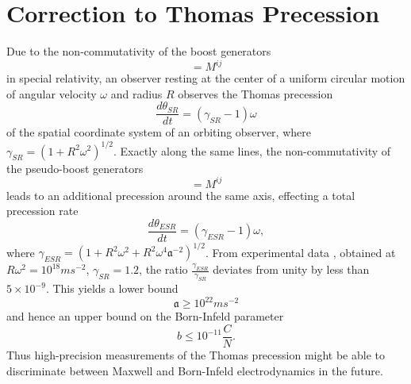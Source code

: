 \documentclass[11pt,a4paper,twoside]{article}
\begin{document}


\section{Correction to Thomas Precession\label{sec_thomas}}
Due to the non-commutativity of the boost generators
\begin{equation}
  [M^{0i},M^{0j}] = M^{ij}
\end{equation}
in special relativity,
an observer resting at the center of a uniform circular motion of
angular velocity $\omega$ and radius $R$ observes the Thomas precession \cite{Thomas}
\begin{equation}
  \frac{d\theta_{SR}}{dt} = (\gamma_{SR}-1)\omega
\end{equation}
of the spatial coordinate system of an orbiting observer, where
$\gamma_{SR} = (1+R^2\omega^2)^{1/2}$.
Exactly along the same lines, the non-commutativity of the
pseudo-boost generators
\begin{equation}
  [I M^{0i},I M^{0j}] = M^{ij}
\end{equation}
leads to an additional precession around the same axis, effecting a
total precession rate
\begin{equation}
 \frac{d\theta_{ESR}}{dt} = (\gamma_{ESR}-1)\omega,
\end{equation}
where $\gamma_{ESR} =
(1+R^2\omega^2+R^2\omega^4\mathfrak{a}^{-2})^{1/2}$. From
experimental data \cite{Newman}, obtained at
$R\omega^2=10^{18}ms^{-2}$, $\gamma_{SR}=1.2$, the ratio
$\frac{\gamma_{ESR}}{\gamma_{SR}}$ deviates from unity by less
than $5 \times 10^{-9}$. This yields a lower bound
\begin{equation}
  \mathfrak{a} \geq 10^{22} ms^{-2}
\end{equation}
and hence an upper bound on the Born-Infeld parameter
\begin{equation}
  b \leq 10^{-11} \frac{C}{N}.
\end{equation}
Thus high-precision measurements of the Thomas precession might be
able to discriminate between Maxwell and Born-Infeld electrodynamics in
the future.
\end{document}
